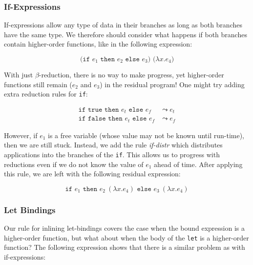 \documentclass[runningheads]{llncs}
\begin{document}

\subsubsection{If-Expressions}

If-expressions allow any type of data in their branches as long as both branches have the same type. We therefore should consider what happens if both branches contain higher-order functions, like in the following expression:

\begin{equation*}
  \texttt{(if $e_1$ then $e_2$ else $e_3$) ($\lambda x. e_4$)}
\end{equation*}

With just $\beta$-reduction, there is no way to make progress, yet higher-order functions still remain ($e_2$ and $e_3$) in the residual program! One might try adding extra reduction rules for \texttt{if}:

\begin{equation*}
  \begin{split}
    \texttt{if true then $e_t$ else $e_f$} &\leadsto e_t \\
    \texttt{if false then $e_t$ else $e_f$} &\leadsto e_f
  \end{split}
\end{equation*}

However, if $e_1$ is a free variable (whose value may not be known until run-time), then we are still stuck. Instead, we add the rule \textit{if-distr} which distributes applications into the branches of the \texttt{if}. This allows us to progress with reductions even if we do not know the value of $e_1$ ahead of time. After applying this rule, we are left with the following residual expression:

\begin{equation*}
  \texttt{if $e_1$ then $e_2\ (\lambda x. e_4)$ else $e_3\ (\lambda x. e_4)$}
\end{equation*}

\subsubsection{Let Bindings}

Our rule for inlining let-bindings covers the case when the bound expression is a higher-order function, but what about when the body of the \texttt{let} is a higher-order function? The following expression shows that there is a similar problem as with if-expressions:
\end{document}

